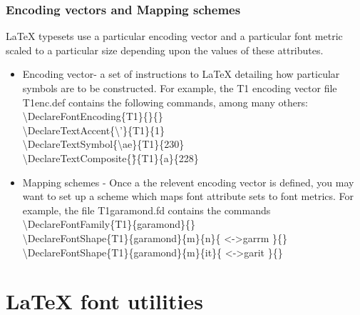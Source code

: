 \documentclass{beamer}
\begin{document}

\begin{frame}[fragile]
\frametitle{Encoding vectors and Mapping schemes}
\vspace{-0.8cm}
\footnotesize{\LaTeX{} typesets use a particular encoding vector and a particular font metric scaled to a particular size depending upon the values of these attributes.}\\

\begin{itemize}
\item \scriptsize{Encoding vector- a set of instructions to LaTeX detailing how particular symbols are to be constructed. For example, the T1 encoding vector file T1enc.def contains the following commands, among many others:}\\[5 pt]
\tiny{ 
  \textbackslash DeclareFontEncoding\{T1\}\{\}\{\}\\
  \textbackslash DeclareTextAccent\{\textbackslash'\}\{T1\}\{1\}\\
  \textbackslash DeclareTextSymbol\{\textbackslash ae\}\{T1\}\{230\}\\
  \textbackslash DeclareTextComposite\{\"\}\{T1\}\{a\}\{228\}}
\item \scriptsize{Mapping schemes - Once a the relevent encoding vector is defined, you may want to set up a scheme which maps font attribute sets to font metrics. For example, the file T1garamond.fd contains the commands}\\[5 pt]
\tiny{
  \textbackslash DeclareFontFamily\{T1\}\{garamond\}\{\}\\
  \textbackslash DeclareFontShape\{T1\}\{garamond\}\{m\}\{n\}\{ \textless-\textgreater garrm \}\{\}\\
  \textbackslash DeclareFontShape\{T1\}\{garamond\}\{m\}\{it\}\{ \textless-\textgreater garit \}\{\}
  }
\end{itemize}
\end{frame}

\section{\LaTeX{} font utilities}
\end{document}

